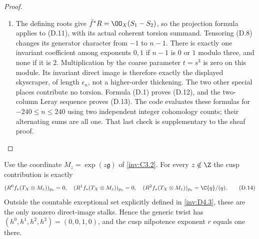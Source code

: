 \begin{proof}
\begin{enumerate}[label=\arabic*.,leftmargin=*]
\item The defining roots give $\bar f^*R=\OO_X(S_1-S_2)$, so the projection
formula applies to (D.11), with its actual coherent torsion summand.
Tensoring (D.8) changes its generator character from $-1$ to $n-1$.
There is exactly one invariant coefficient among exponents $0,1$ if
$n-1$ is $0$ or $1$ modulo three, and none if it is $2$. Multiplication
by the coarse parameter $t=s^3$ is zero on this module. Its invariant
direct image is therefore exactly the displayed skyscraper, of
length $\epsilon_n$, not a higher-order thickening. The two other
special places contribute no torsion. Formula (D.1) proves (D.12),
and the two-column Leray sequence proves (D.13). The code evaluates
these formulas for $-240\le n\le240$ using two independent integer
cohomology counts; their alternating sums are all one. That last
check is supplementary to the sheaf proof.
\end{enumerate}
\end{proof}

\begin{proposition}\label{inv:D4.2}

Use the coordinate $M_z=\exp(z\mathfrak g)$ of \ref{inv:C3.2}. For every
$z\notin\Z$ the cusp contribution is exactly
\[
 (R^0f_*(T_X\otimes M_z))_{p_0}=0,\quad
 (R^1f_*(T_X\otimes M_z))_{p_0}=0,\quad
 (R^2f_*(T_X\otimes M_z))_{p_0}=\C\{q\}/(q).           \tag{D.14}
\]
Outside the countable exceptional set explicitly defined in \ref{inv:D4.3},
these are the only nonzero direct-image stalks. Hence the generic
twist has $(h^0,h^1,h^2,h^3)=(0,0,1,0)$, and the cusp nilpotence exponent $r$ equals one there.
\end{proposition}


